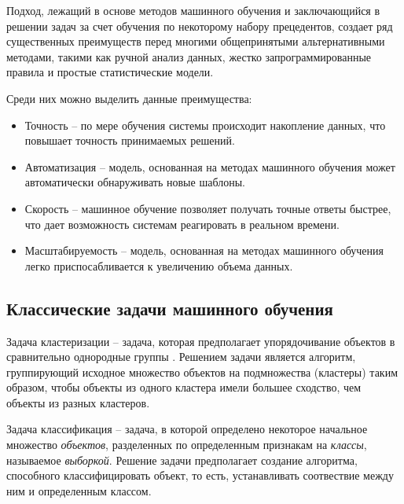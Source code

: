 
Подход, лежащий в основе методов машинного обучения и заключающийся в решении задач
за счет обучения по некоторому набору прецедентов, создает ряд существенных преимуществ
перед многими общепринятыми альтернативными методами, такими как ручной анализ данных,
жестко запрограммированные правила и простые статистические модели.

Среди них можно выделить данные преимущества:

\begin{itemize}
      \item Точность -- по мере обучения системы происходит накопление данных, что
      повышает точность принимаемых решений.

      \item Автоматизация -- модель, основанная на методах машинного обучения
      может автоматически обнаруживать новые шаблоны.

      \item Скорость -- машинное обучение позволяет получать точные ответы быстрее,
      что дает возможность системам реагировать в реальном времени.

      \item Масштабируемость -- модель, основанная на методах машинного обучения
      легко приспосабливается к увеличению объема данных.
\end{itemize}

\subsection{Классические задачи машинного обучения}

Задача кластеризации -- задача, которая предполагает упорядочивание объектов 
в сравнительно однородные группы \cite{mandel}. Решением задачи является алгоритм,
группирующий исходное множество объектов на подмножества (кластеры) таким образом, чтобы
объекты из одного кластера имели большее сходство, чем объекты из разных кластеров.

Задача классификация -- задача, в которой определено некоторое начальное множество
\emph{объектов}, разделенных по определенным признакам на \emph{классы}, называемое
\emph{выборкой}. Решение задачи предполагает создание алгоритма, способного 
классифицировать объект, то есть, устанавливать соотвествие между ним и определенным классом.

